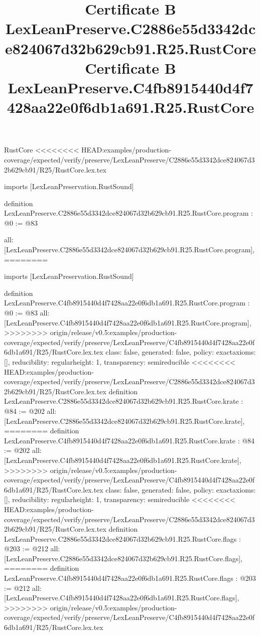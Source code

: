 \begin{lexlean}{RustCore}
<<<<<<<< HEAD:examples/production-coverage/expected/verify/preserve/LexLeanPreserve/C2886e55d3342dce824067d32b629cb91/R25/RustCore.lex.tex
\title{Certificate B LexLeanPreserve.C2886e55d3342dce824067d32b629cb91.R25.RustCore}
\begin{coremodule}
imports [LexLeanPreservation.RustSound]

definition LexLeanPreserve.C2886e55d3342dce824067d32b629cb91.R25.RustCore.program : @0 := @83 {
  all: [LexLeanPreserve.C2886e55d3342dce824067d32b629cb91.R25.RustCore.program],
========
\title{Certificate B LexLeanPreserve.C4fb8915440d4f7428aa22e0f6db1a691.R25.RustCore}
\begin{coremodule}
imports [LexLeanPreservation.RustSound]

definition LexLeanPreserve.C4fb8915440d4f7428aa22e0f6db1a691.R25.RustCore.program : @0 := @83 {
  all: [LexLeanPreserve.C4fb8915440d4f7428aa22e0f6db1a691.R25.RustCore.program],
>>>>>>>> origin/release/v0.5:examples/production-coverage/expected/verify/preserve/LexLeanPreserve/C4fb8915440d4f7428aa22e0f6db1a691/R25/RustCore.lex.tex
  class: false,
  generated: false,
  policy: exact{axioms: []},
  reducibility: regular{height: 1},
  transparency: semireducible
}
<<<<<<<< HEAD:examples/production-coverage/expected/verify/preserve/LexLeanPreserve/C2886e55d3342dce824067d32b629cb91/R25/RustCore.lex.tex
definition LexLeanPreserve.C2886e55d3342dce824067d32b629cb91.R25.RustCore.krate : @84 := @202 {
  all: [LexLeanPreserve.C2886e55d3342dce824067d32b629cb91.R25.RustCore.krate],
========
definition LexLeanPreserve.C4fb8915440d4f7428aa22e0f6db1a691.R25.RustCore.krate : @84 := @202 {
  all: [LexLeanPreserve.C4fb8915440d4f7428aa22e0f6db1a691.R25.RustCore.krate],
>>>>>>>> origin/release/v0.5:examples/production-coverage/expected/verify/preserve/LexLeanPreserve/C4fb8915440d4f7428aa22e0f6db1a691/R25/RustCore.lex.tex
  class: false,
  generated: false,
  policy: exact{axioms: []},
  reducibility: regular{height: 1},
  transparency: semireducible
}
<<<<<<<< HEAD:examples/production-coverage/expected/verify/preserve/LexLeanPreserve/C2886e55d3342dce824067d32b629cb91/R25/RustCore.lex.tex
definition LexLeanPreserve.C2886e55d3342dce824067d32b629cb91.R25.RustCore.flags : @203 := @212 {
  all: [LexLeanPreserve.C2886e55d3342dce824067d32b629cb91.R25.RustCore.flags],
========
definition LexLeanPreserve.C4fb8915440d4f7428aa22e0f6db1a691.R25.RustCore.flags : @203 := @212 {
  all: [LexLeanPreserve.C4fb8915440d4f7428aa22e0f6db1a691.R25.RustCore.flags],
>>>>>>>> origin/release/v0.5:examples/production-coverage/expected/verify/preserve/LexLeanPreserve/C4fb8915440d4f7428aa22e0f6db1a691/R25/RustCore.lex.tex
}}}
\end{coremodule}}
\end{coremodule}
\end{lexlean}
